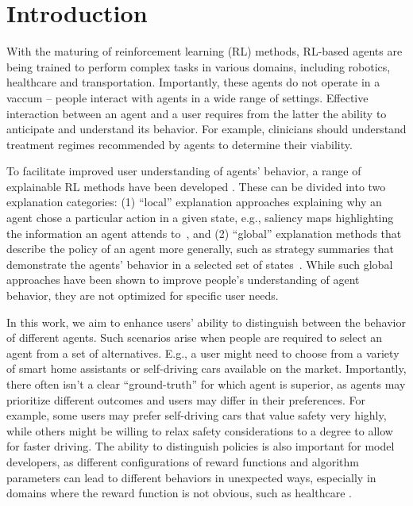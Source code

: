 \section{Introduction}
With the maturing of reinforcement learning (RL) methods, RL-based agents are
being trained to perform complex tasks in various domains, including robotics,
healthcare and transportation. Importantly, these agents do not operate in a
vaccum  -- people interact with agents in a wide range of settings. Effective
interaction between an agent and a user requires from the latter the ability to
anticipate and understand its behavior. For example, clinicians should
understand treatment regimes recommended by agents to determine their viability.

To facilitate improved user understanding of agents' behavior, a
range of explainable RL methods have been developed
\cite{XRL_survey,heuillet2021explainability}. These can be divided into two explanation categories: (1) ``local'' explanation approaches explaining why an agent chose
a particular action in a given state, e.g., saliency maps highlighting the
information an agent attends to~\cite{greydanus2017visualizing}, and (2)
``global'' explanation methods that describe the policy of an agent more
generally, such as strategy summaries that demonstrate the agents' behavior in a
selected set of states~\cite{amir2019summarizing}. While such global approaches have been shown to improve people's understanding of agent behavior,
they are not optimized for specific user needs.

In this work, we aim to enhance users' ability to distinguish between the
behavior of different agents. Such scenarios arise when people are required to
select an agent from a set of alternatives. E.g., a user might need to choose
from a variety of smart home assistants or self-driving cars available on the
market. Importantly, there often isn't a clear ``ground-truth'' for which agent
is superior, as agents may prioritize different outcomes and users may differ in their preferences. For example, some users may prefer self-driving cars that
value safety very highly, while others might be willing to relax safety
considerations to a degree to allow for faster driving. The ability to
distinguish policies is also important for model developers, as different
configurations of reward functions and algorithm parameters can lead to
different behaviors in unexpected ways, especially in domains where the reward
function is not obvious, such as healthcare \cite{gottesman2019guidelines}. 


